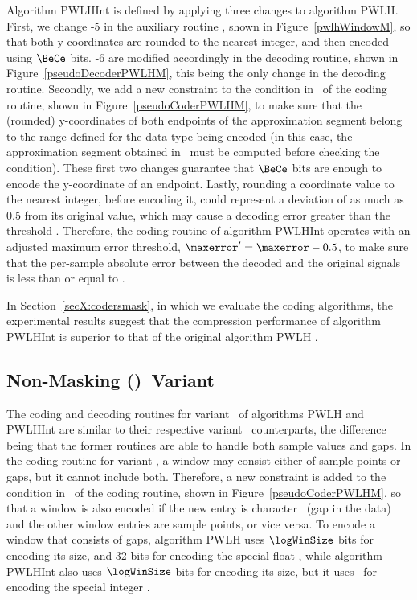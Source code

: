 Algorithm PWLHInt is defined by applying three changes to algorithm PWLH. First, we change -5 in the auxiliary routine \EncodeWindow, shown in Figure~\ref{pwlhWindowM}, so that both y-coordinates are rounded to the nearest integer, and then encoded using $\BeCe$ bits. -6 are modified accordingly in the decoding routine, shown in Figure~\ref{pseudoDecoderPWLHM}, this being the only change in the decoding routine. Secondly, we add a new constraint to the condition in \condLinePWLH\ of the coding routine, shown in Figure~\ref{pseudoCoderPWLHM}, to make sure that the (rounded) y-coordinates of both endpoints of the approximation segment belong to the range defined for the data type being encoded (in this case, the approximation segment obtained in \EncodeWindow\ must be computed before checking the condition). These first two changes guarantee that $\BeCe$ bits are enough to encode the y-coordinate of an endpoint. Lastly, rounding a coordinate value to the nearest integer, before encoding it, could represent a deviation of as much as 0.5 from its original value, which may cause a decoding error greater than the threshold \maxerror. Therefore, the coding routine of algorithm PWLHInt operates with an adjusted maximum error threshold, $\maxerror' = \maxerror - 0.5$, to make sure that the per-sample absolute error between the decoded and the original signals is less than or equal to \maxerror.


In Section~\ref{secX:codersmask}, in which we evaluate the coding algorithms, the experimental results suggest that the compression performance of algorithm PWLHInt is superior to that of the original algorithm PWLH \cite{coder:pwlh}.




\subsection{Non-Masking (\NOmaskalgo)\ Variant}
\label{algo:pwhl:nmvariant}


The coding and decoding routines for variant \NOmaskalgo\ of algorithms PWLH and PWLHInt are similar to their respective variant \maskalgo\ counterparts, the difference being that the former routines are able to handle both sample values and gaps. In the coding routine for variant \NOmaskalgo, a window may consist either of sample points or gaps, but it cannot include both. Therefore, a new constraint is added to the condition in \condLinePWLH\ of the coding routine, shown in Figure~\ref{pseudoCoderPWLHM}, so that a window is also encoded if the new entry is character \noData\ (gap in the data) and the other window entries are sample points, or vice versa. To encode a window that consists of gaps, algorithm PWLH uses $\logWinSize$ bits for encoding its size, and 32 bits for encoding the special float \nodatafloat, while algorithm PWLHInt also uses $\logWinSize$ bits for encoding its size, but it uses \tobitexp\ for encoding the special integer \nodata.

